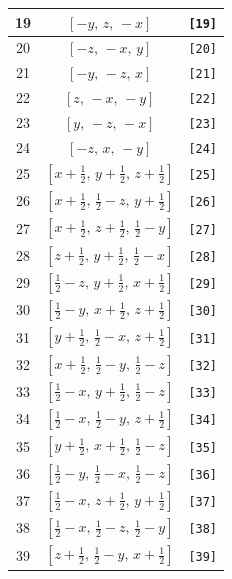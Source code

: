 \documentclass[fleqn,8pt]{jsarticle}
\begin{document}
\begin{longtable}{ccc}
19 & $\left[ - y,\, z,\, - x \right]$ & {\tt [19]} \\ \hline
20 & $\left[ - z,\, - x,\, y \right]$ & {\tt [20]} \\ \hline
21 & $\left[ - y,\, - z,\, x \right]$ & {\tt [21]} \\ \hline
22 & $\left[ z,\, - x,\, - y \right]$ & {\tt [22]} \\ \hline
23 & $\left[ y,\, - z,\, - x \right]$ & {\tt [23]} \\ \hline
24 & $\left[ - z,\, x,\, - y \right]$ & {\tt [24]} \\ \hline
25 & $\left[ x + \frac{1}{2},\, y + \frac{1}{2},\, z + \frac{1}{2} \right]$ & {\tt [25]} \\ \hline
26 & $\left[ x + \frac{1}{2},\, \frac{1}{2} - z,\, y + \frac{1}{2} \right]$ & {\tt [26]} \\ \hline
27 & $\left[ x + \frac{1}{2},\, z + \frac{1}{2},\, \frac{1}{2} - y \right]$ & {\tt [27]} \\ \hline
28 & $\left[ z + \frac{1}{2},\, y + \frac{1}{2},\, \frac{1}{2} - x \right]$ & {\tt [28]} \\ \hline
29 & $\left[ \frac{1}{2} - z,\, y + \frac{1}{2},\, x + \frac{1}{2} \right]$ & {\tt [29]} \\ \hline
30 & $\left[ \frac{1}{2} - y,\, x + \frac{1}{2},\, z + \frac{1}{2} \right]$ & {\tt [30]} \\ \hline
31 & $\left[ y + \frac{1}{2},\, \frac{1}{2} - x,\, z + \frac{1}{2} \right]$ & {\tt [31]} \\ \hline
32 & $\left[ x + \frac{1}{2},\, \frac{1}{2} - y,\, \frac{1}{2} - z \right]$ & {\tt [32]} \\ \hline
33 & $\left[ \frac{1}{2} - x,\, y + \frac{1}{2},\, \frac{1}{2} - z \right]$ & {\tt [33]} \\ \hline
34 & $\left[ \frac{1}{2} - x,\, \frac{1}{2} - y,\, z + \frac{1}{2} \right]$ & {\tt [34]} \\ \hline
35 & $\left[ y + \frac{1}{2},\, x + \frac{1}{2},\, \frac{1}{2} - z \right]$ & {\tt [35]} \\ \hline
36 & $\left[ \frac{1}{2} - y,\, \frac{1}{2} - x,\, \frac{1}{2} - z \right]$ & {\tt [36]} \\ \hline
37 & $\left[ \frac{1}{2} - x,\, z + \frac{1}{2},\, y + \frac{1}{2} \right]$ & {\tt [37]} \\ \hline
38 & $\left[ \frac{1}{2} - x,\, \frac{1}{2} - z,\, \frac{1}{2} - y \right]$ & {\tt [38]} \\ \hline
39 & $\left[ z + \frac{1}{2},\, \frac{1}{2} - y,\, x + \frac{1}{2} \right]$ & {\tt [39]} \\ \hline

\end{longtable}
\end{document}
